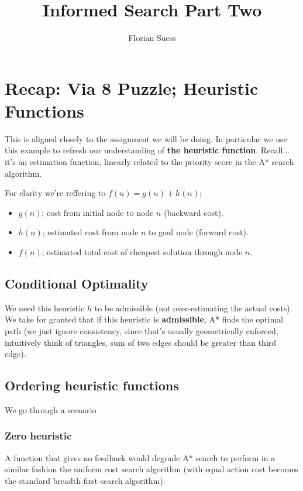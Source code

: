 \documentclass{article}
\begin{document}
\title{Informed Search Part Two}
\date{}
\author{Florian Suess}
\maketitle

\section{Recap: Via 8 Puzzle; Heuristic Functions}
This is aligned closely to the assignment we will be doing. In particular we use this example to refresh our understanding of \textbf{the heuristic function}. Recall... it's an estimation function, linearly related to the priority score in the A* search algorithm. 

For clarity we're reffering to $f(n) = g(n) + h(n)$;
\begin{itemize}
	\item $g(n)$; cost from initial node to node $n$ (backward cost).
	\item $h(n)$; estimated cost from node $n$ to goal node (forward cost).
	\item $f(n)$; estimated total cost of cheapest solution through node $n$.
\end{itemize}

\subsection{Conditional Optimality}
We need this heuristic $h$ to be admissible (not over-estimating the actual costs). We take for granted that if this heuristic is \textbf{admissible}, A* finds the optimal path (we just ignore consistency, since that's usually geometrically enforced, intuitively think of triangles, sum of two edges should be greater than third edge).

\subsection{Ordering heuristic functions}
We go through a scenario

\subsubsection{Zero heuristic}
A function that gives no feedback would degrade A* search to perform in a similar fashion the uniform cost search algorithm (with equal action cost becomes the standard breadth-first-search algorithm).
\end{document}
